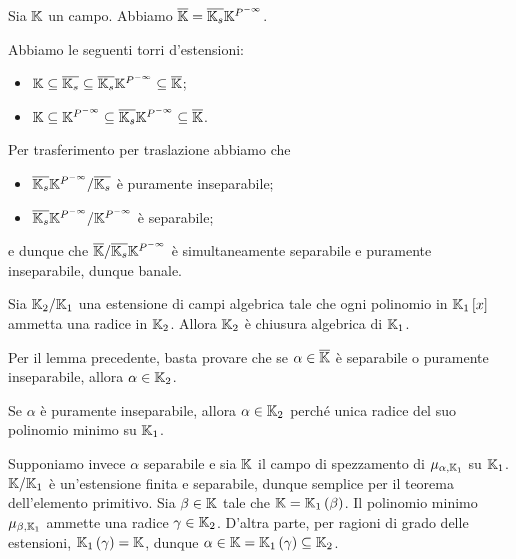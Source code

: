 \begin{Lemma}
	Sia $\mathbb{K}$ un campo. Abbiamo $\AlgebraicClosure{\Field} = \FieldComposition{\SeparableAlgebraicClosure{\Field}\PerfectClosure{\Field}}$.
\end{Lemma}
\Proof Abbiamo le seguenti torri d'estensioni:
\begin{itemize}
	\item $\Field \subseteq \SeparableAlgebraicClosure{\Field} \subseteq \FieldComposition{\SeparableAlgebraicClosure{\Field}\PerfectClosure{\Field}} \subseteq \AlgebraicClosure{\Field}$;
	\item $\Field \subseteq \PerfectClosure{\Field} \subseteq \FieldComposition{\SeparableAlgebraicClosure{\Field}\PerfectClosure{\Field}} \subseteq \AlgebraicClosure{\Field}$.
\end{itemize}
\par Per trasferimento per traslazione abbiamo che
\begin{itemize}
	\item $\FieldExtension{\FieldComposition{\SeparableAlgebraicClosure{\Field}}{\PerfectClosure{\Field}}}{\SeparableAlgebraicClosure{\Field}}$ \`e puramente inseparabile;
	\item $\FieldExtension{\FieldComposition{\SeparableAlgebraicClosure{\Field}}{\PerfectClosure{\Field}}}{\PerfectClosure{\Field}}$ \`e separabile;
\end{itemize}
e dunque che $\FieldExtension{\AlgebraicClosure{\Field}}{\FieldComposition{\SeparableAlgebraicClosure{\Field}}{\PerfectClosure{\Field}}}$ \`e simultaneamente separabile e puramente inseparabile, dunque banale. \EndProof
\begin{Theorem}
	Sia $\mathbb{K}_2/\mathbb{K}_1$ una estensione di campi algebrica tale che ogni polinomio in $\mathbb{K}_1 \left [ x \right ]$ ammetta una radice in $\mathbb{K}_2$. Allora $\mathbb{K}_2$ \`e chiusura algebrica di $\mathbb{K}_1$.
\end{Theorem}
\Proof Per il lemma precedente, basta provare che se $\alpha \in \overline{\mathbb{K}}$ \`e separabile o puramente inseparabile, allora $\alpha \in \mathbb{K}_2$.
\par Se $\alpha$ \`e puramente inseparabile, allora $\alpha \in \mathbb{K}_2$ perch\'e unica radice del suo polinomio minimo su $\mathbb{K}_1$.
\par Supponiamo invece $\alpha$ separabile e sia $\mathbb{K}$ il campo di spezzamento di $\MinimalPolynomial{\alpha}[\Field_1]$ su $\mathbb{K}_1$. $\mathbb{K}/\mathbb{K}_1$ \`e un'estensione finita e separabile, dunque semplice per il teorema dell'elemento primitivo. Sia $\beta \in \mathbb{K}$ tale che $\mathbb{K} = \mathbb{K}_1 \left ( \beta \right )$. Il polinomio minimo $\MinimalPolynomial{\beta}[\Field_1]$ ammette una radice $\gamma \in \mathbb{K}_2$. D'altra parte, per ragioni di grado delle estensioni, $\mathbb{K}_1 \left ( \gamma \right ) = \mathbb{K}$, dunque $\alpha \in \mathbb{K} = \mathbb{K}_1 \left ( \gamma \right ) \subseteq \mathbb{K}_2$. \EndProof
